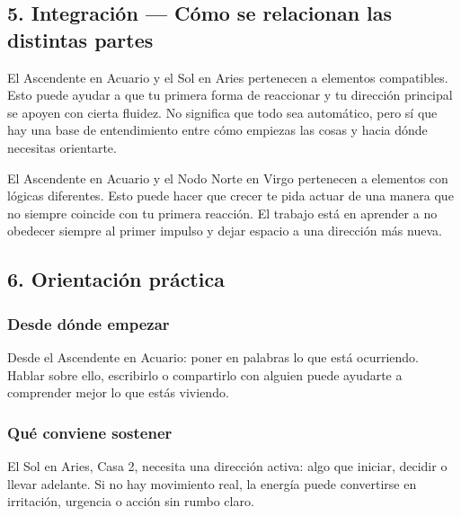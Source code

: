 \documentclass[11pt,a4paper]{article}
\begin{document}
\vspace{0.5cm}


\subsection{5. Integración — Cómo se relacionan las distintas partes}

El Ascendente en Acuario y el Sol en Aries pertenecen a elementos compatibles. Esto puede ayudar a que tu primera forma de reaccionar y tu dirección principal se apoyen con cierta fluidez. No significa que todo sea automático, pero sí que hay una base de entendimiento entre cómo empiezas las cosas y hacia dónde necesitas orientarte.

El Ascendente en Acuario y el Nodo Norte en Virgo pertenecen a elementos con lógicas diferentes. Esto puede hacer que crecer te pida actuar de una manera que no siempre coincide con tu primera reacción. El trabajo está en aprender a no obedecer siempre al primer impulso y dejar espacio a una dirección más nueva.

\vspace{0.5cm}


\subsection{6. Orientación práctica}

\subsubsection*{Desde dónde empezar}
Desde el Ascendente en Acuario: poner en palabras lo que está ocurriendo. Hablar sobre ello, escribirlo o compartirlo con alguien puede ayudarte a comprender mejor lo que estás viviendo.

\subsubsection*{Qué conviene sostener}
El Sol en Aries, Casa 2, necesita una dirección activa: algo que iniciar, decidir o llevar adelante. Si no hay movimiento real, la energía puede convertirse en irritación, urgencia o acción sin rumbo claro.
\end{document}
